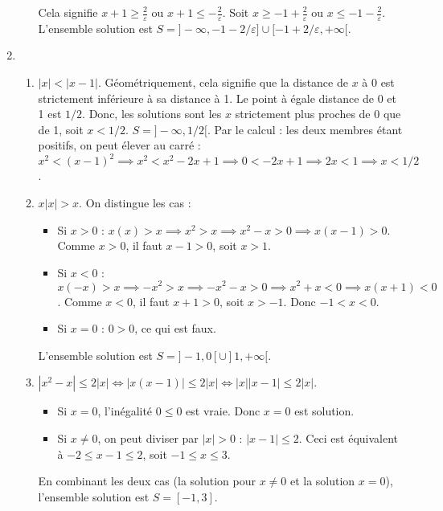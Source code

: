 \documentclass[solutions]{exercices}
\begin{document}
\begin{solution}
\begin{enumerate}
\begin{enumerate}
			            Cela signifie $x+1 \geq \frac{2}{\varepsilon}$ ou $x+1 \leq -\frac{2}{\varepsilon}$.
			            Soit $x \geq -1 + \frac{2}{\varepsilon}$ ou $x \leq -1 - \frac{2}{\varepsilon}$.
			            L'ensemble solution est $S = ]-\infty, -1-2/\varepsilon] \cup [-1+2/\varepsilon, +\infty[$.
		      \end{enumerate}
		\item[3.]
		      \begin{enumerate}
			      \item[(a)] $|x| < |x-1|$. Géométriquement, cela signifie que la distance de $x$ à 0 est strictement inférieure à sa distance à 1. Le point à égale distance de 0 et 1 est $1/2$. Donc, les solutions sont les $x$ strictement plus proches de 0 que de 1, soit $x < 1/2$. $S = ]-\infty, 1/2[$.
			            Par le calcul : les deux membres étant positifs, on peut élever au carré : $x^2 < (x-1)^2 \implies x^2 < x^2 - 2x + 1 \implies 0 < -2x + 1 \implies 2x < 1 \implies x < 1/2$.
			      \item[(b)] $x|x| > x$. On distingue les cas :
			            \begin{itemize}
				            \item Si $x > 0$ : $x(x) > x \implies x^2 > x \implies x^2 - x > 0 \implies x(x-1) > 0$. Comme $x>0$, il faut $x-1>0$, soit $x>1$.
				            \item Si $x < 0$ : $x(-x) > x \implies -x^2 > x \implies -x^2-x > 0 \implies x^2+x < 0 \implies x(x+1) < 0$. Comme $x<0$, il faut $x+1 > 0$, soit $x > -1$. Donc $-1 < x < 0$.
				            \item Si $x=0$ : $0 > 0$, ce qui est faux.
			            \end{itemize}
			            L'ensemble solution est $S = ]-1, 0[ \cup ]1, +\infty[$.
			      \item[(c)] $|x^2 - x| \leq 2|x| \iff |x(x-1)| \leq 2|x| \iff |x||x-1| \leq 2|x|$.
			            \begin{itemize}
				            \item Si $x=0$, l'inégalité $0 \leq 0$ est vraie. Donc $x=0$ est solution.
				            \item Si $x \neq 0$, on peut diviser par $|x| > 0$ : $|x-1| \leq 2$.
				                  Ceci est équivalent à $-2 \leq x-1 \leq 2$, soit $-1 \leq x \leq 3$.
			            \end{itemize}
			            En combinant les deux cas (la solution pour $x \neq 0$ et la solution $x=0$), l'ensemble solution est $S = [-1, 3]$.
		      \end{enumerate}

\end{enumerate}
\end{solution}
\end{document}
